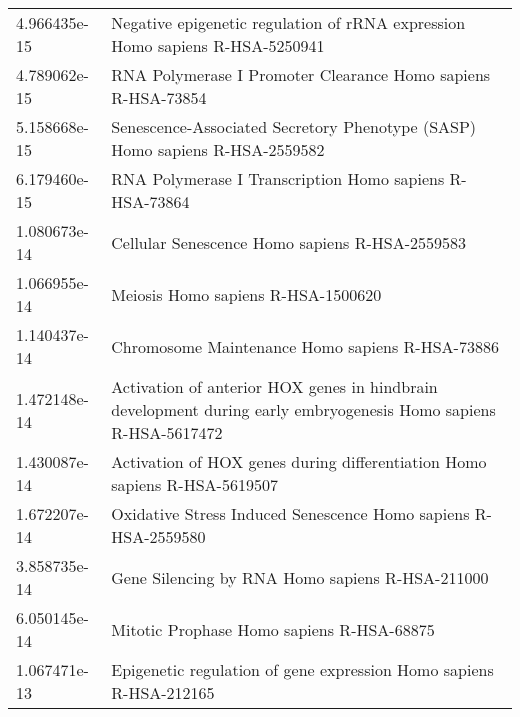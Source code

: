 \begin{longtable}{p{2.4cm}p{14.5cm}}
             4.966435e-15 &                                                          Negative epigenetic regulation of rRNA expression Homo sapiens R-HSA-5250941 \\
             4.789062e-15 &                                                                          RNA Polymerase I Promoter Clearance Homo sapiens R-HSA-73854 \\
             5.158668e-15 &                                                           Senescence-Associated Secretory Phenotype (SASP) Homo sapiens R-HSA-2559582 \\
             6.179460e-15 &                                                                               RNA Polymerase I Transcription Homo sapiens R-HSA-73864 \\
             1.080673e-14 &                                                                                        Cellular Senescence Homo sapiens R-HSA-2559583 \\
             1.066955e-14 &                                                                                                    Meiosis Homo sapiens R-HSA-1500620 \\
             1.140437e-14 &                                                                                       Chromosome Maintenance Homo sapiens R-HSA-73886 \\
             1.472148e-14 &                       Activation of anterior HOX genes in hindbrain development during early embryogenesis Homo sapiens R-HSA-5617472 \\
             1.430087e-14 &                                                             Activation of HOX genes during differentiation Homo sapiens R-HSA-5619507 \\
             1.672207e-14 &                                                                        Oxidative Stress Induced Senescence Homo sapiens R-HSA-2559580 \\
             3.858735e-14 &                                                                                       Gene Silencing by RNA Homo sapiens R-HSA-211000 \\
             6.050145e-14 &                                                                                             Mitotic Prophase Homo sapiens R-HSA-68875 \\
             1.067471e-13 &                                                                    Epigenetic regulation of gene expression Homo sapiens R-HSA-212165 \\

\end{longtable}
